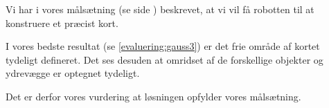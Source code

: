 Vi har i vores målsætning (se side \pageref{problem:maalsaetning}) beskrevet, at vi vil få robotten til at konstruere et præcist kort.



I vores bedste resultat (se \cref{evaluering:gauss3}) er det frie område af kortet tydeligt defineret.
Det ses desuden at omridset af de forskellige objekter og ydrevægge er optegnet tydeligt.

Det er derfor vores vurdering at løsningen opfylder vores målsætning.



